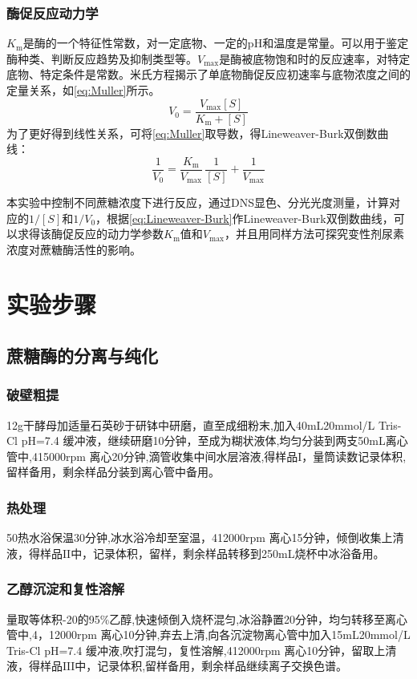 \subsubsection{酶促反应动力学}
\par $K_\mathrm{m}$是酶的一个特征性常数，对一定底物、一定的pH和温度是常量。可以用于鉴定酶种类、判断反应趋势及抑制类型等。$V_\text{max}$是酶被底物饱和时的反应速率，对特定底物、特定条件是常数。米氏方程揭示了单底物酶促反应初速率与底物浓度之间的定量关系，如\autoref{eq:Muller}所示。
\begin{equation}
    V_0 = \frac{V_\text{max}[S]}{K_\text{m} + [S]}
    \label{eq:Muller}
\end{equation}
为了更好得到线性关系，可将\autoref{eq:Muller}取导数，得Lineweaver-Burk双倒数曲线：
\begin{equation}
    \frac{1}{V_0} = \frac{K_\text{m}}{V_\text{max}}\,\frac{1}{[S]} + \frac{1}{V_\text{max}}
    \label{eq:Lineweaver-Burk}
\end{equation}
\par 本实验中控制不同蔗糖浓度下进行反应，通过DNS显色、分光光度测量，计算对应的$1/[S]$和$1/V_0$，根据\autoref{eq:Lineweaver-Burk}作Lineweaver-Burk双倒数曲线，可以求得该酶促反应的动力学参数$K_\text{m}$值和$V_\text{max}$，并且用同样方法可探究变性剂尿素浓度对蔗糖酶活性的影响。

\section{实验步骤}

\subsection{蔗糖酶的分离与纯化}
\subsubsection{破壁粗提}
12g干酵母加适量石英砂于研钵中研磨，直至成细粉末,加入40mL20mmol/L Tris-Cl pH=7.4 缓冲液，继续研磨10分钟，至成为糊状液体,均匀分装到两支50mL离心管中,4\dc 15000rpm 离心20分钟,滴管收集中间水层溶液,得样品$\mathrm{I}$，量筒读数记录体积,留样备用，剩余样品分装到离心管中备用。
\subsubsection{热处理}
50\dc 热水浴保温30分钟,冰水浴冷却至室温，4\dc  12000rpm 离心15分钟，倾倒收集上清液，得样品$\mathrm{II}$中，记录体积，留样，剩余样品转移到250mL烧杯中冰浴备用。
\subsubsection{乙醇沉淀和复性溶解}
量取等体积-20\dc 的95\%乙醇,快速倾倒入烧杯混匀,冰浴静置20分钟，均匀转移至离心管中,4\dc ，12000rpm 离心10分钟,弃去上清,向各沉淀物离心管中加入15mL20mmol/L Tris-Cl pH=7.4 缓冲液,吹打混匀，复性溶解,4\dc  12000rpm 离心10分钟，留取上清液，得样品$\mathrm{III}$中，记录体积,留样备用，剩余样品继续离子交换色谱。
